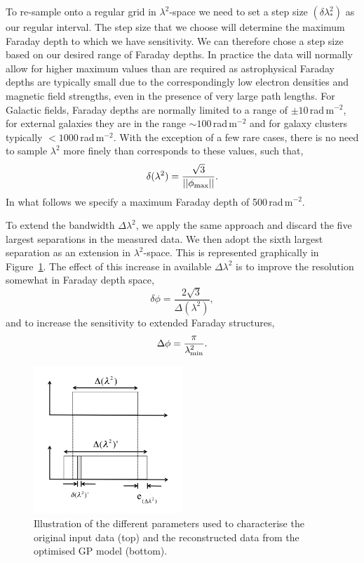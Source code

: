\documentclass[fleqn,usenatbib]{mnras}
\begin{document}
To re-sample onto a regular grid in $\lambda^2$-space we need to set a step size $(\delta \lambda_{\ast}^2)$ as our regular interval. The step size that we choose will determine the maximum Faraday depth to which we have sensitivity. We can therefore chose a step size based on our desired range of Faraday depths. In practice the data will normally allow for higher maximum values than are required as astrophysical Faraday depths are typically small due to the correspondingly low electron densities and magnetic field strengths, even in the presence of very large path lengths. For Galactic fields, Faraday depths are normally limited to a range of $\pm10$\,rad\,m$^{-2}$, for external galaxies they are in the range $\sim100$\,rad\,m$^{-2}$ and for galaxy clusters typically $<1000$\,rad\,m$^{-2}$. With the exception of a few rare cases, there is no need to sample $\lambda^2$ more finely than corresponds to these values, such that,
%
\begin{equation}
 \delta (\lambda^2) = \frac{\sqrt{3}}{||\phi_{\rm max}||}.
\end{equation}
%
In what follows we specify a maximum Faraday depth of 500\,rad\,m$^{-2}$.

To extend the bandwidth $\Delta \lambda^2$, we apply the same approach and discard the five largest separations in the measured data. We then adopt the sixth largest separation as an extension in $\lambda^2$-space. This is represented graphically in Figure~\ref{fig:resampling}. The effect of this increase in available $\Delta \lambda^2$ is to improve the resolution somewhat in Faraday depth space,
%
\begin{equation}
\delta \phi = \frac{2\sqrt{3}}{\Delta (\lambda^2)},
\end{equation}
%
and to increase the sensitivity to extended Faraday structures,
%
\begin{equation}
\label{eq:fdscale}
\Delta \phi = \frac{\pi}{\lambda_{\rm min}^2}.
\end{equation}

\begin{figure}
\includegraphics[width=0.5\textwidth]{./FIGURES/faraday_resampling.png}
\caption{\label{fig:resampling} Illustration of the different parameters used to characterise the original input data (top) and the reconstructed data from the optimised GP model (bottom).}
\end{figure}
\end{document}
